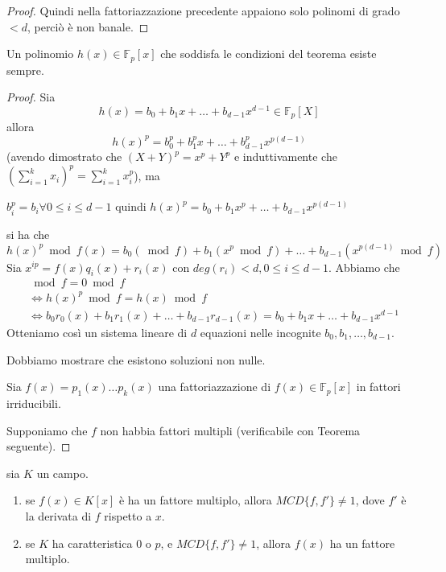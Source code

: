 \documentclass[../main.tex]{subfiles}
\begin{document}
\begin{proof}
    Quindi nella fattoriazzazione precedente appaiono solo polinomi di grado $< d$, perciò è non banale.
\end{proof}

\begin{proposition}
    Un polinomio $h(x) \in \mathbb{F}_p[x]$ che soddisfa le condizioni del teorema esiste sempre.
\end{proposition}
\begin{proof}
    Sia
    \begin{equation*}
        h(x) = b_0 + b_1 x + \ldots + b_{d - 1} x^{d - 1} \in \mathbb{F}_p[X]
    \end{equation*}
    allora
    \begin{equation*}
        h(x)^p = b_0^p + b_1^p x + \ldots + b_{d - 1}^p x^{p(d - 1)}
    \end{equation*}
    (avendo dimostrato che $(X + Y)^p = x^p + Y^p$ e induttivamente che $(\sum_{i=1}^{k} x_i)^p = \sum_{i=1}^{k} x_i^p$), ma
    \begin{center}
        $b_i^p = b_i \forall 0 \leq i \leq d - 1$ quindi $h(x)^p = b_0 + b_1 x^p + \ldots + b_{d - 1} x^{p(d - 1)}$
    \end{center}
    si ha che
    \begin{equation*}
        h(x)^p \bmod f(x) = b_0 (\bmod f) + b_1 (x^p \bmod f) + \ldots + b_{d - 1} (x^{p(d - 1)} \bmod f)
    \end{equation*}
    Sia $x^{ip} = f(x) q_i(x) + r_i(x)$ con $deg(r_i) < d, 0 \leq i \leq d - 1$. Abbiamo che
    \begin{align*}
        [h(x)^p - h(x)] & \bmod f = 0 \bmod f                                                                                         \\
                        & \iff h(x)^p \bmod f = h(x) \bmod f                                                                          \\
                        & \iff b_0 r_0(x) + b_1 r_1(x) + \ldots + b_{d - 1} r_{d - 1}(x) = b_0 + b_1 x + \ldots + b_{d - 1} x^{d - 1}
    \end{align*}
    Otteniamo così un sistema lineare di $d$ equazioni nelle incognite $b_0, b_1, \ldots, b_{d-1}$.

    Dobbiamo mostrare che esistono soluzioni non nulle.

    Sia $f(x) = p_1(x) \ldots p_k(x)$ una fattoriazzazione di $f(x) \in \mathbb{F}_p[x]$ in fattori irriducibili.

    Supponiamo che $f$ non habbia fattori multipli (verificabile con Teorema seguente).
\end{proof}

\begin{theorem}
    sia $K$ un campo.
    \begin{enumerate}[label=\alph*)]
        \item se $f(x) \in K[x]$ è ha un fattore multiplo, allora $MCD\{f, f'\} \neq 1$, dove $f'$ è la derivata di $f$ rispetto a $x$.
        \item se $K$ ha caratteristica 0 o $p$, e $MCD\{f, f'\} \neq 1$, allora $f(x)$ ha un fattore multiplo.
    \end{enumerate}
\end{theorem}
\end{document}
